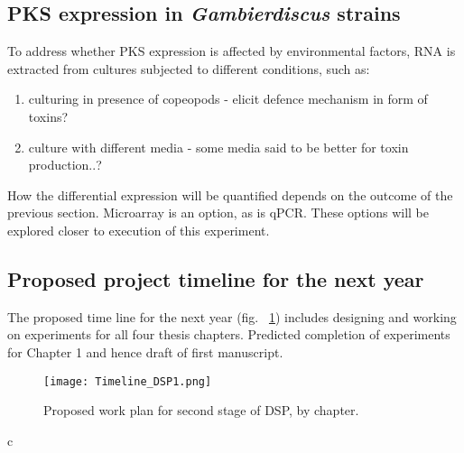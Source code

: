 \documentclass[12pt]{article}
\begin{document}
\subsection{PKS expression in \emph{Gambierdiscus} strains}
To address whether PKS expression is affected by environmental factors, RNA is extracted from cultures subjected to different conditions, such as: 
\begin{enumerate}
\item culturing in presence of copeopods - elicit defence mechanism in form of toxins?
\item culture with different media - some media said to be better for toxin production..?
\end{enumerate}
How the differential expression will be quantified depends on the outcome of the previous section. Microarray is an option, as is qPCR. These options will be explored closer to execution of this experiment.

\subsection{Proposed project timeline for the next year} 
The proposed time line for the next year (fig. ~\ref{fig:timeline}) includes designing and working on experiments for all four thesis chapters. Predicted completion of experiments for Chapter 1 and hence draft of first manuscript.
\FloatBarrier
\begin{figure} 
\texttt{[image: Timeline\_DSP1.png]} 
\caption{Proposed work plan for second stage of DSP, by chapter.} 
\label{fig:timeline}
\end{figure} 
\FloatBarrier 
c


\newpage


\end{document}
